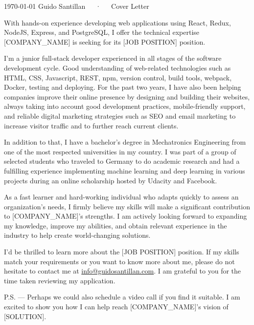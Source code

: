 \documentclass[11pt, a4paper]{awesome-cv}
\begin{document}
\makecvheader[C]

\makecvfooter
  {\today}
  {Guido Santillan~~~·~~~Cover Letter}
  {}

\makelettertitle

\begin{cvletter}

With hands-on experience developing web applications using React, Redux, NodeJS, Express, and PostgreSQL, I offer the technical expertise [COMPANY_NAME] is seeking for its [JOB POSITION] position.

I'm a junior full-stack developer experienced in all stages of the software development cycle. Good understanding of web-related technologies such as HTML, CSS, Javascript, REST, npm, version control, build tools, webpack, Docker, testing and deploying. For the past two years, I have also been helping companies improve their online presence by designing and building their websites, always taking into account good development practices, mobile-friendly support, and reliable digital marketing strategies such as SEO and email marketing to increase visitor traffic and to further reach current clients.

In addition to that, I have a bachelor's degree in Mechatronics Engineering from one of the most respected universities in my country. I was part of a group of selected students who traveled to Germany to do academic research and had a fulfilling experience implementing machine learning and deep learning in various projects during an online scholarship hosted by Udacity and Facebook.

As a fast learner and hard-working individual who adapts quickly to assess an organization's needs, I firmly believe my skills will make a significant contribution to [COMPANY_NAME]'s strengths. I am actively looking forward to expanding my knowledge, improve my abilities, and obtain relevant experience in the industry to help create world-changing solutions.

I'd be thrilled to learn more about the [JOB POSITION] position. If my skills match your requirements or you want to know more about me, please do not hesitate to contact me at \href{mailto:info@guidosantillan.com}{info@guidosantillan.com}. I am grateful to you for the time taken reviewing my application.

\end{cvletter}

\makeletterclosing

P.S. — Perhaps we could also schedule a video call if you find it suitable. I am excited to show you how I can help reach [COMPANY_NAME]'s vision of [SOLUTION].
\end{document}
